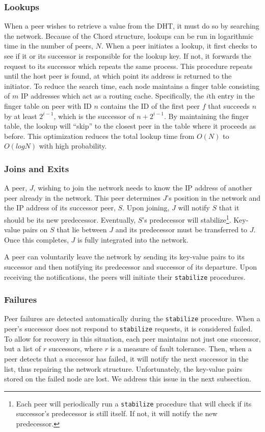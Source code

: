 \documentclass[twocolumn]{article}
\begin{document}
\subsubsection{Lookups}
When a peer wishes to retrieve a value from the DHT, it must do so by searching the network. Because of the Chord structure, lookups can be run in logarithmic time in the number of peers, $N$. When a peer initiates a lookup, it first checks to see if it or its successor is responsible for the lookup key. If not, it forwards the request to its successor which repeats the same process. This procedure repeats until the host peer is found, at which point its address is returned to the initiator. To reduce the search time, each node maintains a finger table consisting of $m$ IP addresses which act as a routing cache. Specifically, the $i$th entry in the finger table on peer with ID $n$ contains the ID of the first peer $f$ that succeeds $n$ by at least $2^{i-1}$, which is the successor of $n+2^{i-1}$. By maintaining the finger table, the lookup will \enquote{skip} to the closest peer in the table where it proceeds as before. This optimization reduces the total lookup time from $O(N)$ to $O(log⁡{N})$ with high probability.

\subsubsection{Joins and Exits}
A peer, $J$, wishing to join the network needs to know the IP address of another peer already in the network. This peer determines $J$'s position in the network and the IP address of its successor peer, $S$. Upon joining, $J$ will notify $S$ that it should be its new predecessor. Eventually, $S$'s predecessor will stabilize\footnote{Each peer will periodically run a \texttt{stabilize} procedure that will check if its successor's predecessor is still itself. If not, it will notify the new predecessor.}. Key-value pairs on $S$ that lie between $J$ and its predecessor must be transferred to $J$. Once this completes, $J$ is fully integrated into the network.

A peer can voluntarily leave the network by sending its key-value pairs to its successor and then notifying its predecessor and successor of its departure. Upon receiving the notifications, the peers will initiate their \texttt{stabilize} procedures.

\subsubsection{Failures}
Peer failures are detected automatically during the \texttt{stabilize} procedure. When a peer's successor does not respond to \texttt{stabilize} requests, it is considered failed. To allow for recovery in this situation, each peer maintains not just one successor, but a list of $r$ successors, where $r$ is a measure of fault tolerance. Then, when a peer detects that a successor has failed, it will notify the next successor in the list, thus repairing the network structure. Unfortunately, the key-value pairs stored on the failed node are lost. We address this issue in the next subsection.
\end{document}
